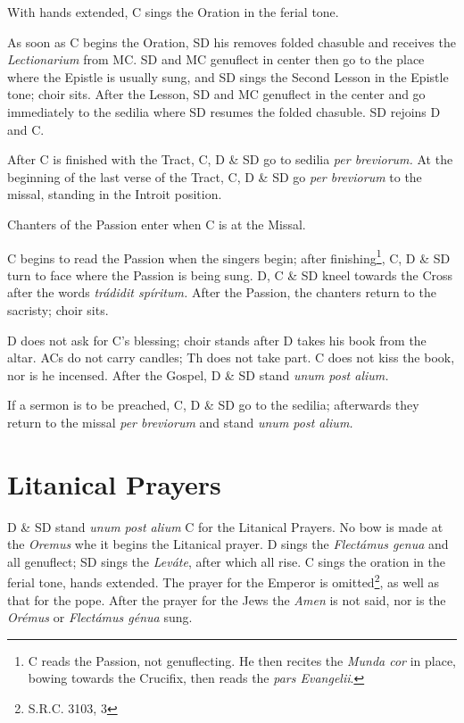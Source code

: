 {    \rubric With hands extended, C sings the Oration in the ferial tone.

    \rubric As soon as C begins the Oration, SD his removes folded chasuble and
    receives the \textit{Lectionarium} from MC. SD and MC genuflect in center
    then go to the place where the Epistle is usually sung, and SD sings the
    Second Lesson in the Epistle tone; choir sits. After the Lesson, SD and MC
    genuflect in the center and go immediately to the sedilia where SD resumes
    the folded chasuble. SD rejoins D and C.

    \rubric After C is finished with the Tract, C, D \& SD go to sedilia
    \textit{per breviorum.} At the beginning of the last verse of the Tract, C,
    D \& SD go \textit{per breviorum} to the missal, standing in the Introit
    position.

    \rubric Chanters of the Passion enter when C is at the Missal.

    \rubric C begins to read the Passion when the singers begin; after
    finishing\footnote{C reads the Passion, not genuflecting. He then recites
    the \textit{Munda cor} in place, bowing towards the Crucifix, then reads
    the \textit{pars Evangelii}.}, C, D \& SD turn to face where the Passion is
    being sung. D, C \& SD kneel towards the Cross after the words \textit{trádidit
    spíritum.} After the Passion, the chanters return to the sacristy; choir sits.

    \rubric D does not ask for C's blessing; choir stands after D takes his
    book from the altar. ACs do not carry candles; Th does not take part. C
    does not kiss the book, nor is he incensed. After the Gospel, D \& SD stand
    \textit{unum post alium.}

    \rubric If a sermon is to be preached, C, D \& SD go to the sedilia;
    afterwards they return to the missal \textit{per breviorum} and stand
    \textit{unum post alium.}

    \section{Litanical Prayers}

    \rubric D \& SD stand \textit{unum post alium} C for the Litanical Prayers.
    No bow is made at the \textit{Oremus} whe it begins the Litanical prayer. D
    sings the \textit{Flectámus genua} and all genuflect; SD sings the
    \textit{Leváte}, after which all rise. C sings the oration in the ferial
    tone, hands extended. The prayer for the Emperor is omitted\footnote{S.R.C.
    3103, 3}, as well as that for the pope. After the prayer for the Jews the
    \textit{Amen} is not said, nor is the \textit{Orémus} or \textit{Flectámus
    génua} sung.

}
